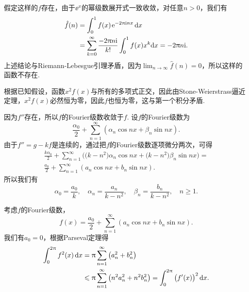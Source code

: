 \begin{ans}
  \method 假定这样的$f$存在，由于$\ee^x$的幂级数展开式一致收敛，对任意$n>0$，我们有
  \begin{align*}
    \hat f(n) & = \int_0^1f(x)\operatorname{\!\!\;\mathrm e}^{-2\uppi\mathrm i nx}\mathrm dx\\
     & = \sum_{k=0}^\infty\frac{-2\uppi n\mathrm i}{k!}
     \int_0^1f(x)x^k\mathrm dx = -2\uppi n\mathrm i.
  \end{align*}
  上述结论与Riemann-Lebesgue引理矛盾，因为$\lim_{n\to\infty}\hat f(n)=0$，所以这样的函数不存在.

  \method 根据已知假设，函数$x^2f(x)$与所有的多项式正交，因此由Stone-Weierstrass逼近定理，$x^2f(x)$必然恒为零，因此$f$也恒为零，这与第一个积分矛盾.
\end{ans}

\begin{ans}
  因为$f''$存在，所以$f$的Fourier级数收敛于$f$. 设$f$的Fourier级数为
  \[
    \frac{\alpha_0}2 + \sum_{n=1}^\infty
    (\alpha_n\cos nx+\beta_n\sin nx).
  \]
  由于$f''=g-kf$是连续的，通过把$f$的Fourier级数逐项微分两次，可得
  \begin{gather*}
    \frac{k\alpha_0}2 + \sum_{n=1}^\infty
    \Big( \big(k-n^2\big)\alpha_n\cos nx+
    \big(k-n^2\big)\beta_n\sin nx
     \Big) =\\
     \frac{a_0}2 + \sum_{n=1}^\infty (a_n\cos nx+b_n\sin nx).
  \end{gather*}
  所以我们有
  \[
    \alpha_0=\frac{a_0}k,\quad \alpha_n=\frac{a_n}{k-n^2},\quad
    \beta_n=\frac{b_n}{k-n^2},\quad n\ge1.
  \]
\end{ans}

\begin{ans}
  考虑$f$的Fourier级数，
  \[
    f(x) = \frac{a_0}2 + \sum_{n=1}^\infty
    ( a_n\cos nx + b_n\sin nx ).
  \]
  我们有$a_0=0$，根据Parseval定理得
  \begin{align*}
    \int_0^{2\uppi} f^2(x)\,\mathrm dx & = \uppi\sum_{n=1}^\infty
    \big( a_n^2+b_n^2 \big) \\
    & \leqslant \uppi\sum_{n=1}^\infty \big( n^2a_n^2+n^2b_n^2 \big)
    = \int_0^{2\uppi}\big(f'(x)\big)^2\,\mathrm dx.
  \end{align*}
\end{ans}


